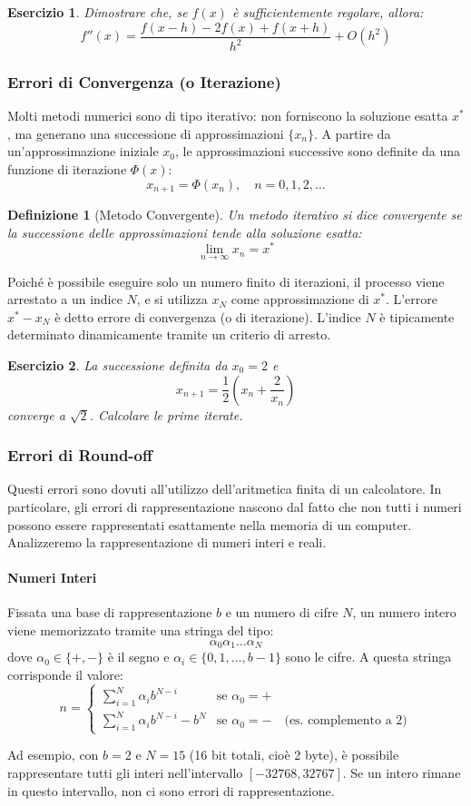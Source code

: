 \documentclass{article}
\newtheorem{definition}{Definizione}[section]
\newtheorem{esercizio}{Esercizio}[section]
\begin{document}
\begin{esercizio}
Dimostrare che, se $f(x)$ è sufficientemente regolare, allora:
$$ f''(x) = \frac{f(x-h) - 2f(x) + f(x+h)}{h^2} + O(h^2) $$
\end{esercizio}

\subsubsection{Errori di Convergenza (o Iterazione)}
Molti metodi numerici sono di tipo iterativo: non forniscono la soluzione esatta $x^*$, ma generano una successione di approssimazioni $\{x_n\}$. A partire da un'approssimazione iniziale $x_0$, le approssimazioni successive sono definite da una funzione di iterazione $\Phi(x)$:
$$ x_{n+1} = \Phi(x_n), \quad n=0, 1, 2, \dots $$

\begin{definition}[Metodo Convergente]
Un metodo iterativo si dice convergente se la successione delle approssimazioni tende alla soluzione esatta:
$$ \lim_{n \to \infty} x_n = x^* $$
\end{definition}

Poiché è possibile eseguire solo un numero finito di iterazioni, il processo viene arrestato a un indice $N$, e si utilizza $x_N$ come approssimazione di $x^*$. L'errore $x^* - x_N$ è detto errore di convergenza (o di iterazione). L'indice $N$ è tipicamente determinato dinamicamente tramite un criterio di arresto.

\begin{esercizio}
La successione definita da $x_0 = 2$ e
$$ x_{n+1} = \frac{1}{2}\left(x_n + \frac{2}{x_n}\right) $$
converge a $\sqrt{2}$. Calcolare le prime iterate.
\end{esercizio}

\subsubsection{Errori di Round-off}
Questi errori sono dovuti all'utilizzo dell'aritmetica finita di un calcolatore. In particolare, gli errori di rappresentazione nascono dal fatto che non tutti i numeri possono essere rappresentati esattamente nella memoria di un computer.
Analizzeremo la rappresentazione di numeri interi e reali.

\paragraph{Numeri Interi}
Fissata una base di rappresentazione $b$ e un numero di cifre $N$, un numero intero viene memorizzato tramite una stringa del tipo:
$$ \alpha_0 \alpha_1 \dots \alpha_N $$
dove $\alpha_0 \in \{+,-\}$ è il segno e $\alpha_i \in \{0, 1, \dots, b-1\}$ sono le cifre. A questa stringa corrisponde il valore:
\[ n = 
\begin{cases} 
\sum_{i=1}^{N} \alpha_i b^{N-i} & \text{se } \alpha_0 = + \\
\sum_{i=1}^{N} \alpha_i b^{N-i} - b^N & \text{se } \alpha_0 = - \quad \text{(es. complemento a 2)}
\end{cases}
\]

Ad esempio, con $b=2$ e $N=15$ (16 bit totali, cioè 2 byte), è possibile rappresentare tutti gli interi nell'intervallo $[-32768, 32767]$. Se un intero rimane in questo intervallo, non ci sono errori di rappresentazione.
\end{document}
